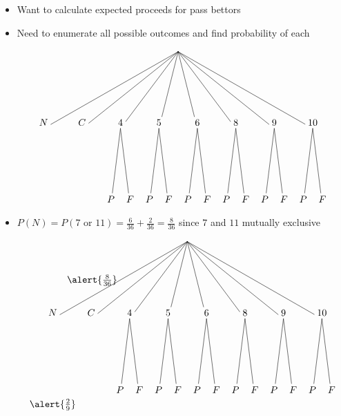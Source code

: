 \documentclass{beamer}
\theoremstyle{definition}
\begin{document}
\begin{frame}
\begin{itemize}
\item Want to calculate expected proceeds for pass bettors
\item Need to enumerate all possible outcomes and find probability of each
\[\begin{xy}<1.4cm,0cm>:
(4.5,0)="0"; (1,-2)="N"; (2,-2)="C"; (3,-2)="4";
(4,-2)="5"; (5,-2)="6"; (6,-2)="8"; (7,-2)="9"; (8,-2)="10";
"0";"N"*+!D{N}**\dir{-};
"0";"C"*+!D{C}**\dir{-};
"0";"4"*+!D{4}**\dir{-};
"0";"5"*+!D{5}**\dir{-};
"0";"6"*+!D{6}**\dir{-};
"0";"8"*+!D{8}**\dir{-};
"0";"9"*+!D{9}**\dir{-};
"0";"10"*+!D{10}**\dir{-};
"4";(2.75,-4)*+!D{P}**\dir{-};
"4";(3.25,-4)*+!D{F}**\dir{-};
"5";(3.75,-4)*+!D{P}**\dir{-};
"5";(4.25,-4)*+!D{F}**\dir{-};
"6";(4.75,-4)*+!D{P}**\dir{-};
"6";(5.25,-4)*+!D{F}**\dir{-};
"8";(5.75,-4)*+!D{P}**\dir{-};
"8";(6.25,-4)*+!D{F}**\dir{-};
"9";(6.75,-4)*+!D{P}**\dir{-};
"9";(7.25,-4)*+!D{F}**\dir{-};
"10";(7.75,-4)*+!D{P}**\dir{-};
"10";(8.25,-4)*+!D{F}**\dir{-};
\end{xy}\]
\end{itemize}
\end{frame}

\begin{frame}
\begin{itemize}
\item $P\left(N\right)=
P\left(\text{$7$ or $11$}\right)
=\frac{6}{36}+\frac{2}{36}=\frac{8}{36}$
since $7$ and $11$ mutually exclusive
\[\begin{xy}<1.4cm,0cm>:
(4.5,0)="0";
(1,-2)="N";(2,-2)="C";(3,-2)="4";(4,-2)="5";
(5,-2)="6";(6,-2)="8";(7,-2)="9";(8,-2)="10";
"0";"N"*+!D{N}**\dir{-}?*+!R{\alert{\frac{8}{36}}};
"0";"C"*+!D{C}**\dir{-};
"0";"4"*+!D{4}**\dir{-};
"0";"5"*+!D{5}**\dir{-};
"0";"6"*+!D{6}**\dir{-};
"0";"8"*+!D{8}**\dir{-};
"0";"9"*+!D{9}**\dir{-};
"0";"10"*+!D{10}**\dir{-};
"4";(2.75,-4)*+!D{P}**\dir{-};
"4";(3.25,-4)*+!D{F}**\dir{-};
"5";(3.75,-4)*+!D{P}**\dir{-};
"5";(4.25,-4)*+!D{F}**\dir{-};
"6";(4.75,-4)*+!D{P}**\dir{-};
"6";(5.25,-4)*+!D{F}**\dir{-};
"8";(5.75,-4)*+!D{P}**\dir{-};
"8";(6.25,-4)*+!D{F}**\dir{-};
"9";(6.75,-4)*+!D{P}**\dir{-};
"9";(7.25,-4)*+!D{F}**\dir{-};
"10";(7.75,-4)*+!D{P}**\dir{-};
"10";(8.25,-4)*+!D{F}**\dir{-};
(1,-4)*+!U{\alert{\frac{2}{9}}};
\end{xy}\]
\end{itemize}
\end{frame}
\end{document}
